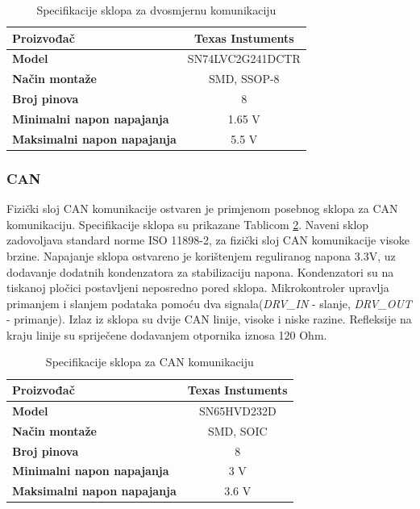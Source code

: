 \documentclass[11pt,a4paper]{article}
\begin{document}
\begin{table}[H]
	\centering
	\caption{Specifikacije sklopa za dvosmjernu komunikaciju}
	\label{tab:specifikacija_dynamixel_buffer}
	\begin{tabular}{|l|c|}
		\hline
		\textbf{Proizvođač} & Texas Instuments \\ \hline 
		\textbf{Model} & SN74LVC2G241DCTR \\ \hline 
		\textbf{Način montaže} & SMD, SSOP-8 \\ \hline 
		\textbf{Broj pinova} & 8 \\ \hline 
		\textbf{Minimalni napon napajanja} & 1.65 V \\ \hline 
		\textbf{Maksimalni napon napajanja} & 5.5 V    \\ \hline
	\end{tabular}
\end{table}


\subsubsection{CAN}
Fizički sloj CAN komunikacije ostvaren je primjenom posebnog sklopa za CAN komunikaciju. Specifikacije sklopa su prikazane Tablicom \ref{tab:specifikacija_CAN_bus}. Naveni sklop zadovoljava standard norme ISO 11898-2, za fizički sloj CAN komunikacije visoke brzine. Napajanje sklopa ostvareno je korištenjem reguliranog napona 3.3V, uz dodavanje dodatnih kondenzatora za stabilizaciju napona. Kondenzatori su na tiskanoj pločici postavljeni neposredno pored sklopa. Mikrokontroler upravlja primanjem i slanjem podataka pomoću dva signala(\textit{DRV\_IN} - slanje, \textit{DRV\_OUT} - primanje). Izlaz iz sklopa su dvije CAN linije, visoke i niske razine. Refleksije na kraju linije su spriječene dodavanjem otpornika iznosa 120 Ohm.

\begin{table}[H]
	\centering
	\caption{Specifikacije sklopa za CAN komunikaciju}
	\label{tab:specifikacija_CAN_bus}
	\begin{tabular}{|l|c|}
		\hline
		\textbf{Proizvođač} & Texas Instuments \\ \hline 
		\textbf{Model} &  SN65HVD232D \\ \hline 
		\textbf{Način montaže} & SMD, SOIC \\ \hline 
		\textbf{Broj pinova} & 8 \\ \hline 
		\textbf{Minimalni napon napajanja} & 3 V \\ \hline 
		\textbf{Maksimalni napon napajanja} & 3.6 V    \\ \hline
	\end{tabular}
\end{table}
\end{document}
